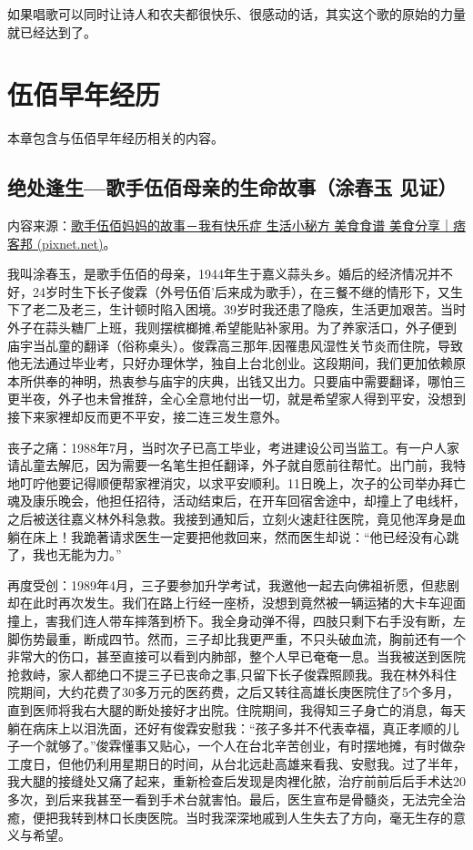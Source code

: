 \documentclass[UTF8,a4paper,oneside,twocolumn,12pt]{ctexbook}
\begin{document}
如果唱歌可以同时让诗人和农夫都很快乐、很感动的话，其实这个歌的原始的力量就已经达到了。
\chapter{伍佰早年经历}
本章包含与伍佰早年经历相关的内容。
\section{绝处逢生---歌手伍佰母亲的生命故事（涂春玉 见证）}
内容来源：\href{https://dana1002.pixnet.net/blog/post/32855089}{歌手伍佰妈妈的故事－我有快乐症 生活小秘方 美食食谱 美食分享｜痞客邦 (pixnet.net)}。

我叫涂春玉，是歌手伍佰的母亲，1944年生于嘉义蒜头乡。婚后的经济情况并不好，24岁时生下长子俊霖（外号伍佰'后来成为歌手），在三餐不继的情形下，又生下了老二及老三，生计顿时陷入困境。39岁时我还患了隐疾，生活更加艰苦。当时外子在蒜头糖厂上班，我则摆槟榔摊,希望能贴补家用。为了养家活口，外子便到庙宇当乩童的翻译（俗称桌头）。俊霖高三那年,因罹患风湿性关节炎而住院，导致他无法通过毕业考，只好办理休学，独自上台北创业。这段期间，我们更加依赖原本所供奉的神明，热衷参与庙宇的庆典，出钱又出力。只要庙中需要翻译，哪怕三更半夜，外子也未曾推辞，全心全意地付出一切，就是希望家人得到平安，没想到接下来家裡却反而更不平安，接二连三发生意外。

丧子之痛：1988年7月，当时次子已高工毕业，考进建设公司当监工。有一户人家请乩童去解厄，因为需要一名笔生担任翻译，外子就自愿前往帮忙。出门前，我特地叮咛他要记得顺便帮家裡消灾，以求平安顺利。11日晚上，次子的公司举办拜亡魂及康乐晚会，他担任招待，活动结束后，在开车回宿舍途中，却撞上了电线杆，之后被送往嘉义林外科急救。我接到通知后，立刻火速赶往医院，竟见他浑身是血躺在床上！我跪著请求医生一定要把他救回来，然而医生却说：“他已经没有心跳了，我也无能为力。”

再度受创：1989年4月，三子要参加升学考试，我邀他一起去向佛祖祈愿，但悲剧却在此时再次发生。我们在路上行经一座桥，没想到竟然被一辆运猪的大卡车迎面撞上，害我们连人带车摔落到桥下。我全身动弹不得，四肢只剩下右手没有断，左脚伤势最重，断成四节。然而，三子却比我更严重，不只头破血流，胸前还有一个非常大的伤口，甚至直接可以看到内肺部，整个人早已奄奄一息。当我被送到医院抢救峙，家人都绝口不提三子已丧命之事,只留下长子俊霖照顾我。我在林外科住院期间，大约花费了30多万元的医药费，之后又转往高雄长庚医院住了5个多月，直到医师将我右大腿的断处接好才出院。住院期间，我得知三子身亡的消息，每天躺在病床上以泪洗面，还好有俊霖安慰我：“孩子多并不代表幸福，真正孝顺的儿子一个就够了。”俊霖懂事又贴心，一个人在台北辛苦创业，有时摆地摊，有时做杂工度日，但他仍利用星期日的时间，从台北远赴高雄来看我、安慰我。过了半年，我大腿的接缝处又痛了起来，重新检查后发现是肉裡化脓，治疗前前后后手术达20多次，到后来我甚至一看到手术台就害怕。最后，医生宣布是骨髓炎，无法完全治癒，便把我转到林口长庚医院。当时我深深地戚到人生失去了方向，毫无生存的意义与希望。
\end{document}

